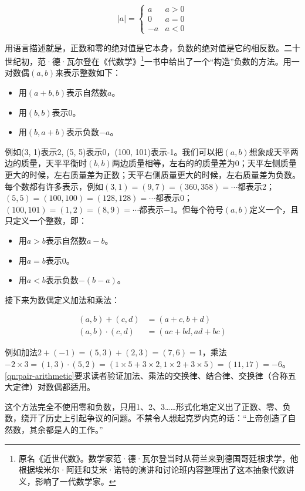 \documentclass[b5paper]{ctexart}
\begin{document}
\[
|a| = \begin{cases}
  a & a > 0 \\
  0 & a = 0 \\
  -a & a < 0
\end{cases}
\]

用语言描述就是，正数和零的绝对值是它本身，负数的绝对值是它的相反数。二十世纪初，范·德·瓦尔登在《代数学》\footnote{原名《近世代数》。数学家范·德·瓦尔登当时从荷兰来到德国哥廷根求学，他根据埃米尔·阿廷和艾米·诺特的演讲和讨论班内容整理出了这本抽象代数讲义，影响了一代数学家。}一书中给出了一个“构造”负数的方法。用一对数偶$(a, b)$来表示整数如下：
\begin{itemize}
\item 用$(a + b, b)$表示自然数$a$。
\item 用$(b, b)$表示0。
\item 用$(b, a + b)$表示负数$-a$。
\end{itemize}

例如(3, 1)表示2, (5, 5)表示0，(100, 101)表示-1。我们可以把$(a, b)$想象成天平两边的质量，天平平衡时$(b, b)$两边质量相等，左右的的质量差为0；天平左侧质量更大的时候，左右质量差为正数；天平右侧质量更大的时候，左右质量差为负数。每个数都有许多表示，例如$(3, 1) = (9, 7) = (360, 358) = \cdots$都表示2；$(5, 5) = (100, 100) = (128, 128) = \cdots$都表示0；$(100, 101) = (1, 2) = (8, 9) = \cdots$都表示$-1$。但每个符号$(a, b)$定义一个，且只定义一个整数，即：

\begin{itemize}
\item 用$a > b$表示自然数$a - b$。
\item 用$a = b$表示0。
\item 用$a < b$表示负数$-(b - a)$。
\end{itemize}

接下来为数偶定义加法和乘法：

\begin{align}
(a, b) + (c, d) &= (a + c, b + d) \\
(a, b) \cdot (c, d) &= (ac + bd, ad + bc)
\label{eq:pair-add-mul}
\end{align}

例如加法$2 + (-1) = (5, 3) + (2, 3) = (7, 6) = 1$，乘法$-2 \times 3 = (1, 3) \cdot (5, 2) = (1 \times 5 + 3 \times 2, 1 \times 2 + 3 \times 5) = (11, 17) = -6$。\cref{qn:pair-arithmetic}要求读者验证加法、乘法的交换律、结合律、交换律（合称五大定律）对数偶都适用。

这个方法完全不使用零和负数，只用1、2、3……形式化地定义出了正数、零、负数，绕开了历史上引起争议的问题。不禁令人想起克罗内克的话：“上帝创造了自然数，其余都是人的工作。”
\end{document}
